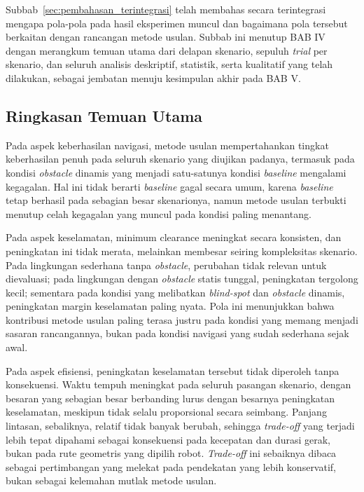 Subbab~\ref{sec:pembahasan_terintegrasi} telah membahas secara terintegrasi
mengapa pola-pola pada hasil eksperimen muncul dan bagaimana pola tersebut
berkaitan dengan rancangan metode usulan. Subbab ini menutup BAB IV dengan
merangkum temuan utama dari delapan skenario, sepuluh \textit{trial} per
skenario, dan seluruh analisis deskriptif, statistik, serta kualitatif yang
telah dilakukan, sebagai jembatan menuju kesimpulan akhir pada BAB V.

\subsection{Ringkasan Temuan Utama}

Pada aspek keberhasilan navigasi, metode usulan mempertahankan tingkat
keberhasilan penuh pada seluruh skenario yang diujikan padanya, termasuk
pada kondisi \textit{obstacle} dinamis yang menjadi satu-satunya kondisi
\textit{baseline} mengalami kegagalan. Hal ini tidak berarti \textit{baseline}
gagal secara umum, karena \textit{baseline} tetap berhasil pada sebagian
besar skenarionya, namun metode usulan terbukti menutup celah kegagalan yang
muncul pada kondisi paling menantang.

Pada aspek keselamatan, minimum clearance meningkat secara konsisten, dan
peningkatan ini tidak merata, melainkan membesar seiring kompleksitas
skenario. Pada lingkungan sederhana tanpa \textit{obstacle}, perubahan tidak
relevan untuk dievaluasi; pada lingkungan dengan \textit{obstacle} statis
tunggal, peningkatan tergolong kecil; sementara pada kondisi yang melibatkan
\textit{blind-spot} dan \textit{obstacle} dinamis, peningkatan margin
keselamatan paling nyata. Pola ini menunjukkan bahwa kontribusi metode
usulan paling terasa justru pada kondisi yang memang menjadi sasaran
rancangannya, bukan pada kondisi navigasi yang sudah sederhana sejak awal.

Pada aspek efisiensi, peningkatan keselamatan tersebut tidak diperoleh
tanpa konsekuensi. Waktu tempuh meningkat pada seluruh pasangan skenario,
dengan besaran yang sebagian besar berbanding lurus dengan besarnya
peningkatan keselamatan, meskipun tidak selalu proporsional secara seimbang.
Panjang lintasan, sebaliknya, relatif tidak banyak berubah, sehingga
\textit{trade-off} yang terjadi lebih tepat dipahami sebagai konsekuensi
pada kecepatan dan durasi gerak, bukan pada rute geometris yang dipilih
robot. \textit{Trade-off} ini sebaiknya dibaca sebagai pertimbangan yang
melekat pada pendekatan yang lebih konservatif, bukan sebagai kelemahan
mutlak metode usulan.

